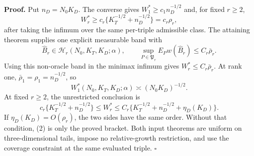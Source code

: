 \textbf{Proof.}
Put \(n_D=N_0K_D\). The converse gives \(W_1^*\ge c_1n_D^{-1/2}\) and, for fixed \(r\ge2\),
\[
 W_r^*\ge c_r\{K_T^{-1/2}+n_D^{-1/2}\}=c_r\rho_r,
\]
after taking the infimum over the same per-triple admissible class. The attaining theorem supplies one explicit measurable band with
\[
 \widehat B_r\in\mathcal H_r(N_0,K_T,K_D;\alpha),
 \qquad \sup_{P\in\mathfrak P_r}E_Pw(\widehat B_r)
 \le C_r\bar\rho_r.                                      \tag{1}
\]
Using this non-oracle band in the minimax infimum gives \(W_r^*\le C_r\bar\rho_r\). At rank one, \(\bar\rho_1=\rho_1=n_D^{-1/2}\), so
\[
 W_1^*(N_0,K_T,K_D;\alpha)\asymp(N_0K_D)^{-1/2}.
\]
At fixed \(r\ge2\), the unrestricted conclusion is
\[
 c_r\{K_T^{-1/2}+n_D^{-1/2}\}
 \le W_r^*\le C_r\{K_T^{-1/2}+n_D^{-1/2}+\eta_D(K_D)\}. \tag{2}
\]
If \(\eta_D(K_D)=O(\rho_r)\), the two sides have the same order. Without that condition, (2) is only the proved bracket. Both input theorems are uniform on three-dimensional tails, impose no relative-growth restriction, and use the coverage constraint at the same evaluated triple. \(\square\)